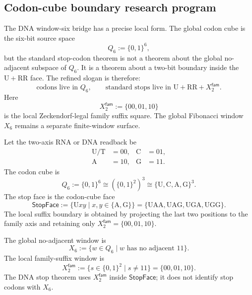\subsection{Codon-cube boundary research program}
\label{subsec:philosophy-codon-cube-boundary-program}

The DNA window-six bridge has a precise local form. The global codon
cube is the six-bit source space
$$
  Q_{6}:=\{0,1\}^{6},
$$
but the standard stop-codon theorem is not a theorem about the global
no-adjacent subspace of $Q_{6}$. It is a theorem about a two-bit
boundary inside the $\mathrm{U}+\mathrm{RR}$ face. The refined slogan is
therefore:
$$
  \text{codons live in }Q_{6},\qquad
  \text{standard stops live in }\mathrm{U}+\mathrm{RR}+X_{2}^{\mathsf{fam}}.
$$
Here
$$
  X_{2}^{\mathsf{fam}}:=\{00,01,10\}
$$
is the local Zeckendorf-legal family suffix square. The global
Fibonacci window $X_{6}$ remains a separate finite-window surface.

\begin{definition}
\label{def:philosophy-codon-cube-local-stop-boundary}
Let the two-axis RNA or DNA readback be
$$
\begin{aligned}
  \mathrm{U}/\mathrm{T} &= 00,&
  \mathrm{C} &= 01,\\
  \mathrm{A} &= 10,&
  \mathrm{G} &= 11.
\end{aligned}
$$
The codon cube is
$$
  Q_{6}:=\{0,1\}^{6}
  \cong
  (\{0,1\}^{2})^{3}
  \cong
  \{\mathrm{U},\mathrm{C},\mathrm{A},\mathrm{G}\}^{3}.
$$
The stop face is the codon-cube face
$$
  \mathsf{StopFace}:=
  \{\mathrm{U}xy\mid x,y\in\{\mathrm{A},\mathrm{G}\}\}
  =
  \{\mathrm{UAA},\mathrm{UAG},\mathrm{UGA},\mathrm{UGG}\}.
$$
The local suffix boundary is obtained by projecting the last two
positions to the family axis and retaining only
$X_{2}^{\mathsf{fam}}=\{00,01,10\}$.
\end{definition}

\begin{definition}
\label{def:philosophy-global-local-no-eleven-spaces}
The global no-adjacent window is
$$
  X_{6}:=\{w\in Q_{6}\mid w\text{ has no adjacent }11\}.
$$
The local family-suffix window is
$$
  X_{2}^{\mathsf{fam}}
  :=
  \{s\in\{0,1\}^{2}\mid s\neq 11\}
  =
  \{00,01,10\}.
$$
The DNA stop theorem uses $X_{2}^{\mathsf{fam}}$ inside
$\mathsf{StopFace}$; it does not identify stop codons with $X_{6}$.
\end{definition}

